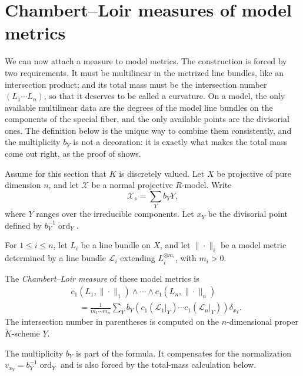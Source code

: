 \section{Chambert--Loir measures of model metrics}
\label{sec:metrics-cl-measure}

We can now attach a measure to model metrics. The construction is forced by
two requirements. It must be multilinear in the metrized line bundles, like
an intersection product; and its total mass must be the intersection number
$(L_1\cdots L_n)$, so that it deserves to be called a curvature. On a
model, the only available multilinear data are the degrees of the model line
bundles on the components of the special fiber, and the only available
points are the divisorial ones. The definition below is the unique way to
combine them consistently, and the multiplicity $b_Y$ is not a decoration:
it is exactly what makes the total mass come out right, as the proof of
 shows.

Assume for this section that $K$ is discretely valued. Let $X$ be
projective of pure dimension $n$, and let $\mathcal X$ be a normal
projective $R$-model. Write
\[
                        \mathcal X_s=\sum_Y b_YY,
\]
where $Y$ ranges over the irreducible components. Let $x_Y$ be the
divisorial point defined by $b_Y^{-1}\operatorname{ord}_Y$.

For $1\leq i\leq n$, let $L_i$ be a line bundle on $X$, and let
$\|\cdot\|_i$ be a model metric determined by a line bundle
$\mathcal L_i$ extending $L_i^{\otimes m_i}$, with $m_i>0$.

\begin{definition}
\label{def:metrics-mixed-model-measure}
The \emph{Chambert--Loir measure} of these model metrics is
\[
\begin{split}
 &c_1(L_1,\|\cdot\|_1)\wedge\cdots\wedge
                 c_1(L_n,\|\cdot\|_n)\\
 &\quad =
 \frac{1}{m_1\cdots m_n}
 \sum_Y b_Y
 \left(
 c_1(\mathcal L_1|_Y)\cdots c_1(\mathcal L_n|_Y)
 \right)\delta_{x_Y}.
\end{split}
\]
The intersection number in parentheses is computed on the
$n$-dimensional proper $\widetilde K$-scheme $Y$.
\end{definition}

The multiplicity $b_Y$ is part of the formula. It compensates for the
normalization $v_{x_Y}=b_Y^{-1}\operatorname{ord}_Y$ and is also forced by
the total-mass calculation below.

